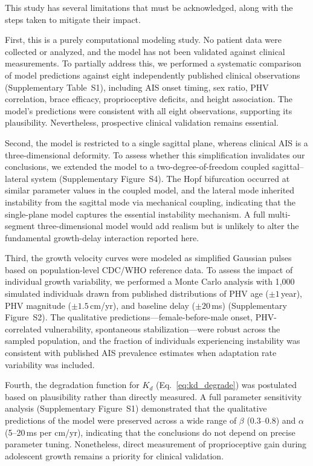 \documentclass[12pt,a4paper]{article}
\begin{document}
This study has several limitations that must be acknowledged, along with the steps taken to mitigate their impact.

First, this is a purely computational modeling study. No patient data were collected or analyzed, and the model has not been validated against clinical measurements. To partially address this, we performed a systematic comparison of model predictions against eight independently published clinical observations (Supplementary Table~S1), including AIS onset timing, sex ratio, PHV correlation, brace efficacy, proprioceptive deficits, and height association. The model's predictions were consistent with all eight observations, supporting its plausibility. Nevertheless, prospective clinical validation remains essential.

Second, the model is restricted to a single sagittal plane, whereas clinical AIS is a three-dimensional deformity. To assess whether this simplification invalidates our conclusions, we extended the model to a two-degree-of-freedom coupled sagittal--lateral system (Supplementary Figure~S4). The Hopf bifurcation occurred at similar parameter values in the coupled model, and the lateral mode inherited instability from the sagittal mode via mechanical coupling, indicating that the single-plane model captures the essential instability mechanism. A full multi-segment three-dimensional model would add realism but is unlikely to alter the fundamental growth-delay interaction reported here.

Third, the growth velocity curves were modeled as simplified Gaussian pulses based on population-level CDC/WHO reference data. To assess the impact of individual growth variability, we performed a Monte Carlo analysis with 1{,}000 simulated individuals drawn from published distributions of PHV age ($\pm 1$\,year), PHV magnitude ($\pm 1.5$\,cm/yr), and baseline delay ($\pm 20$\,ms) (Supplementary Figure~S2). The qualitative predictions---female-before-male onset, PHV-correlated vulnerability, spontaneous stabilization---were robust across the sampled population, and the fraction of individuals experiencing instability was consistent with published AIS prevalence estimates when adaptation rate variability was included.

Fourth, the degradation function for $K_d$ (Eq.~\ref{eq:kd_degrade}) was postulated based on plausibility rather than directly measured. A full parameter sensitivity analysis (Supplementary Figure~S1) demonstrated that the qualitative predictions of the model were preserved across a wide range of $\beta$ (0.3--0.8) and $\alpha$ (5--20\,ms per cm/yr), indicating that the conclusions do not depend on precise parameter tuning. Nonetheless, direct measurement of proprioceptive gain during adolescent growth remains a priority for clinical validation.
\end{document}
